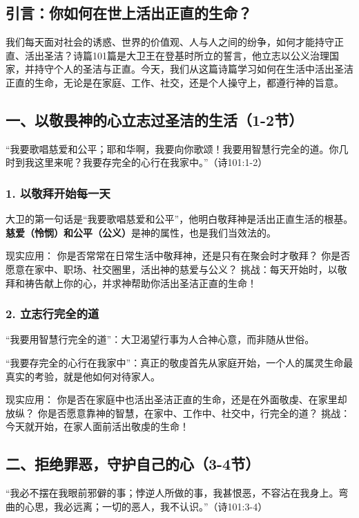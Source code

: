 \documentclass[a4paper, 12pt]{article}
\begin{document}
\subsection*{引言：你如何在世上活出正直的生命？}
我们每天面对社会的诱惑、世界的价值观、人与人之间的纷争，如何才能持守正直、活出圣洁？诗篇101篇是大卫王在登基时所立的誓言，他立志以公义治理国家，并持守个人的圣洁与正直。今天，我们从这篇诗篇学习如何在生活中活出圣洁正直的生命，无论是在家庭、工作、社交，还是个人操守上，都遵行神的旨意。

\subsection*{一、以敬畏神的心立志过圣洁的生活（1-2节）}
“我要歌唱慈爱和公平；耶和华啊，我要向你歌颂！我要用智慧行完全的道。你几时到我这里来呢？我要存完全的心行在我家中。”（诗101:1-2）

\subsubsection*{1. 以敬拜开始每一天}
\hspace{0.6cm}大卫的第一句话是“我要歌唱慈爱和公平”，他明白敬拜神是活出正直生活的根基。
\textbf{慈爱（怜悯）和公平（公义）}是神的属性，也是我们当效法的。

现实应用：
你是否常常在日常生活中敬拜神，还是只有在聚会时才敬拜？
你是否愿意在家中、职场、社交圈里，活出神的慈爱与公义？
挑战：每天开始时，以敬拜和祷告献上你的心，并求神帮助你活出圣洁正直的生命！

\subsubsection*{2. 立志行完全的道}
\hspace{0.4cm}“我要用智慧行完全的道”：大卫渴望行事为人合神心意，而非随从世俗。

“我要存完全的心行在我家中”：真正的敬虔首先从家庭开始，一个人的属灵生命最真实的考验，就是他如何对待家人。

现实应用：
你是否在家庭中也活出圣洁正直的生命，还是在外面敬虔、在家里却放纵？
你是否愿意靠神的智慧，在家中、工作中、社交中，行完全的道？
挑战：今天就开始，在家人面前活出敬虔的生命！

\subsection*{二、拒绝罪恶，守护自己的心（3-4节）}
“我必不摆在我眼前邪僻的事；悖逆人所做的事，我甚恨恶，不容沾在我身上。弯曲的心思，我必远离；一切的恶人，我不认识。”（诗101:3-4）
\end{document}
